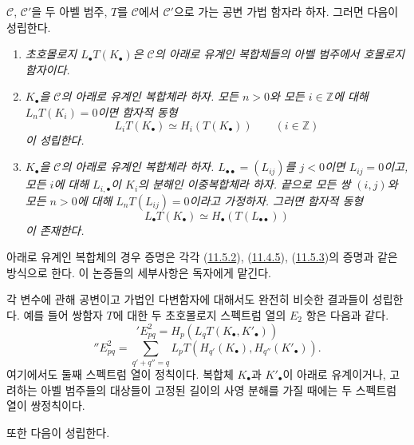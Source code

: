 \begin{proposition}[11.6.3]
\label{0.11.6.3-fr}
$\mathcal C$, $\mathcal C'$을 두 아벨 범주, $T$를 $\mathcal C$에서
$\mathcal C'$으로 가는 공변 가법 함자라 하자. 그러면 다음이
성립한다.
\begin{enumerate}
\item[\rm(i)]
\emph{초호몰로지 $L_\bullet T(K_\bullet)$은 $\mathcal C$의 아래로
유계인 복합체들의 아벨 범주에서 호몰로지 함자이다.}
\item[\rm(ii)]
\emph{$K_\bullet$을 $\mathcal C$의 아래로 유계인 복합체라 하자.
모든 $n>0$와 모든 $i\in\mathbb Z$에 대해 $L_nT(K_i)=0$이면
함자적 동형}
\[
\label{0.11.6.3.1-fr}
\tag{11.6.3.1}
L_iT(K_\bullet)\simeq H_i(T(K_\bullet))\qquad(i\in\mathbb Z)
\]
\emph{이 성립한다.}
\item[\rm(iii)]
\emph{$K_\bullet$을 $\mathcal C$의 아래로 유계인 복합체라 하자.
$L_{\bullet\bullet}=(L_{ij})$를 $j<0$이면 $L_{ij}=0$이고, 모든
$i$에 대해 $L_{i,\bullet}$이 $K_i$의 분해인 이중복합체라 하자.
끝으로 모든 쌍 $(i,j)$와 모든 $n>0$에 대해
$L_nT(L_{ij})=0$이라고 가정하자. 그러면 함자적 동형}
\[
\label{0.11.6.3.2-fr}
\tag{11.6.3.2}
L_\bullet T(K_\bullet)\simeq H_\bullet(T(L_{\bullet\bullet}))
\]
\emph{이 존재한다.}
\end{enumerate}
아래로 유계인 복합체의 경우 증명은 각각
(\hyperref[0.11.5.2-ko]{11.5.2}),
(\hyperref[0.11.4.5-fr]{11.4.5}),
(\hyperref[0.11.5.3-ko]{11.5.3})의 증명과 같은 방식으로 한다.
이 논증들의 세부사항은 독자에게 맡긴다.
\end{proposition}

\begin{env}[11.6.4]
\label{0.11.6.4-fr}
각 변수에 관해 공변이고 가법인 다변함자에 대해서도 완전히 비슷한
결과들이 성립한다. 예를 들어 쌍함자 $T$에 대한 두 초호몰로지
스펙트럼 열의 $E_2$ 항은 다음과 같다.
\[
\label{0.11.6.4.1-fr}
\tag{11.6.4.1}
{}'E^2_{pq}=H_p(L_qT(K_\bullet,K'_\bullet))
\]
\[
\label{0.11.6.4.2-fr}
\tag{11.6.4.2}
{}''E^2_{pq}=
\sum_{q'+q''=q}L_pT(H_{q'}(K_\bullet),H_{q''}(K'_\bullet)).
\]
여기에서도 둘째 스펙트럼 열이 정칙이다. 복합체 $K_\bullet$과
$K'_\bullet$이 아래로 유계이거나, 고려하는 아벨 범주들의 대상들이
고정된 길이의 사영 분해를 가질 때에는 두 스펙트럼 열이 쌍정칙이다.

또한 다음이 성립한다.
\end{env}

